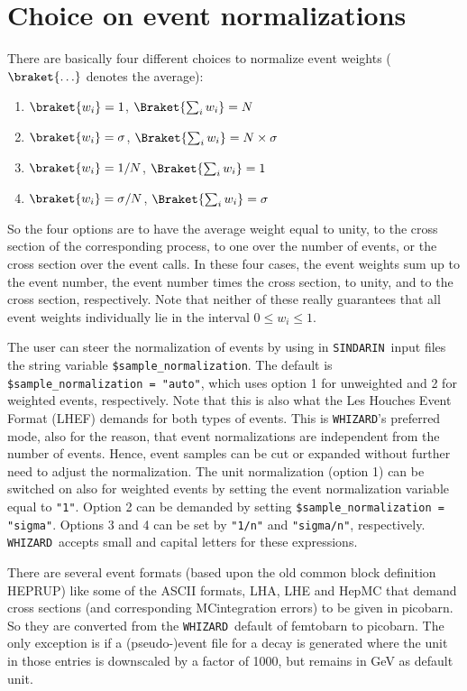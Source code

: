 \documentclass[12pt]{book}
\newcommand{\ttt}[1]{\texttt{#1}}
\newcommand{\whizard}{\ttt{WHIZARD}}
\newcommand{\sindarin}{\ttt{SINDARIN}}
\begin{document}

\section{Choice on event normalizations}

There are basically four different choices to normalize event weights
($\braket{\ldots}$ denotes the average):
\begin{enumerate}
\item $\braket{w_i} = 1$, \qquad\qquad $\Braket{\sum_i w_i} = N$
\item $\braket{w_i} = \sigma$, \qquad\qquad $\Braket{\sum_i w_i} = N
  \times \sigma$
\item $\braket{w_i} = 1/N$, \quad\qquad $\Braket{\sum_i w_i} = 1$
\item $\braket{w_i} = \sigma/N$, \quad\qquad $\Braket{\sum_i w_i} = \sigma$
\end{enumerate}
So the four options are to have the average weight equal to unity, to
the cross section of the corresponding process, to one over the number
of events, or the cross section over the event calls. In these four
cases, the event weights sum up to the event number, the event number
times the cross section, to unity, and to the cross section,
respectively. Note that neither of these really guarantees that all
event weights individually lie in the interval $0 \leq w_i \leq 1$.

The user can steer the normalization of events by using in \sindarin\
input files the string variable \ttt{\$sample\_normalization}. The default is
\ttt{\$sample\_normalization = "auto"}, which uses option 1 for
unweighted and 2 for weighted events, respectively. Note that this is
also what the Les Houches Event Format (LHEF) demands for both types
of events. This is \whizard's preferred mode, also for the reason, that
event normalizations are independent from the number of events. Hence,
event samples can be cut or expanded without further need to adjust
the normalization. The unit normalization (option 1) can be switched
on also for weighted events by setting the event normalization
variable equal to \ttt{"1"}. Option 2 can be demanded
by setting \ttt{\$sample\_normalization = "sigma"}. Options 3 and 4 can
be set by \ttt{"1/n"} and \ttt{"sigma/n"}, respectively. \whizard\
accepts small and capital letters for these expressions.

There are several event formats (based upon the old common block
definition HEPRUP) like some of the ASCII formats, LHA, LHE and HepMC
that demand cross sections (and corresponding MCintegration errors) to
be given in picobarn. So they are converted from the \whizard\ default
of femtobarn to picobarn. The only exception is if a (pseudo-)event
file for a decay is generated where the unit in those entries is
downscaled by a factor of 1000, but remains in GeV as default unit.
\end{document}
